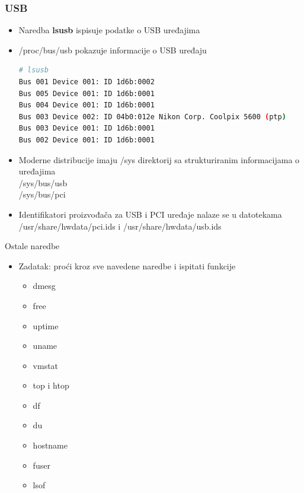 \documentclass[croatian,t]{beamer} %
\begin{document}
	\begin{frame}[fragile]
	\frametitle{USB}
		\begin{itemize}
			\item Naredba \textbf{lsusb} ispisuje podatke o USB uređajima
			\item /proc/bus/usb pokazuje informacije o USB uređaju
			\begin{lstlisting}[basicstyle={\tiny\ttfamily},language=bash]
# lsusb
Bus 001 Device 001: ID 1d6b:0002  
Bus 005 Device 001: ID 1d6b:0001  
Bus 004 Device 001: ID 1d6b:0001  
Bus 003 Device 002: ID 04b0:012e Nikon Corp. Coolpix 5600 (ptp)
Bus 003 Device 001: ID 1d6b:0001  
Bus 002 Device 001: ID 1d6b:0001
			\end{lstlisting}
			\item Moderne distribucije imaju /sys direktorij sa strukturiranim informacijama o uređajima \\
				/sys/bus/usb \\
				/sys/bus/pci \\
			\item Identifikatori proizvođača za USB i PCI uređaje nalaze se u datotekama /usr/share/hwdata/pci.ids i /usr/share/hwdata/usb.ids
		\end{itemize}
	\end{frame}
	
	\begin{frame}{Ostale naredbe}
		\begin{itemize}
			\item Zadatak: proći kroz sve navedene naredbe i ispitati funkcije
		\begin{itemize}
			\item dmesg
			\item free
			\item uptime
			\item uname
			\item vmstat
			\item top i htop
			\item df
			\item du
			\item hostname
			\item fuser
			\item lsof
		\end{itemize}
		\end{itemize}
	\end{frame}
	
\end{document}
